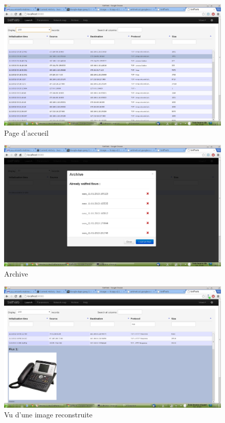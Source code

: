 

\begin{figure}[h!]
\centering
\includegraphics[scale=0.5]{NormalView.png}
\caption{Page d'accueil}
\label{NormalView}
\end{figure}

\begin{figure}[h!]
\centering
\includegraphics[scale=0.5]{Archive.png}
\caption{Archive}
\label{Archive}
\end{figure}

\begin{figure}[h!]
\centering
\includegraphics[scale=0.5]{DetailView.png}
\caption{Vu d'une image reconstruite}
\label{DetailView}
\end{figure}


